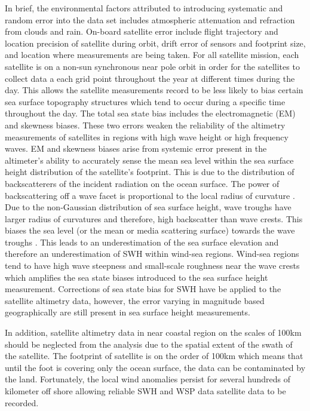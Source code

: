 \documentclass[draft,linenumbers]{agujournal2018}
\begin{document}
In brief, the environmental factors attributed to introducing systematic and random error into the data set includes atmospheric attenuation and refraction from clouds and rain. On-board satellite error include flight trajectory and location precision of satellite during orbit, drift error of sensors and footprint size, and location where measurements are being taken. For all satellite mission, each satellite is on a non-sun synchronous near pole orbit in order for the satellites to collect data a each grid point throughout the year at different times during the day. This allows the satellite measurements record to be less likely to bias certain sea surface topography structures which tend to occur during a specific time throughout the day. The total sea state bias includes the electromagnetic (EM) and skewness biases. These two errors weaken the reliability of the altimetry measurements of satellites in regions with high wave height or high frequency waves. EM and skewness biases arise from systemic error present in the altimeter's ability to accurately sense the mean sea level within the sea surface height distribution of the satellite's footprint. This is due to the distribution of backscatterers of the incident radiation on the ocean surface. The power of backscattering off a wave facet is proportional to the local radius of curvature \cite{fu2000satellite}. Due to the non-Gaussian distribution of sea surface height, wave troughs have larger radius of curvatures and therefore, high backscatter than wave crests. This biases the sea level (or the mean or media scattering surface) towards the wave troughs \cite{fu2000satellite}. This leads to an underestimation of the sea surface elevation and therefore an underestimation of SWH within wind-sea regions. Wind-sea regions tend to have high wave steepness and small-scale roughness near the wave crests which amplifies the sea state biases introduced to the sea surface height measurement. Corrections of sea state bias for SWH have be applied to the satellite altimetry data, however, the error varying in magnitude based geographically are still present in sea surface height measurements.

In addition, satellite altimetry data in near coastal region on the scales of 100km should be neglected from the analysis due to the spatial extent of the swath of the satellite. The footprint of satellite is on the order of 100km which means that until the foot is covering only the ocean surface, the data can be contaminated by the land. Fortunately, the local wind anomalies persist for several hundreds of kilometer off shore allowing reliable SWH and WSP data satellite data to be recorded. 
\end{document}
